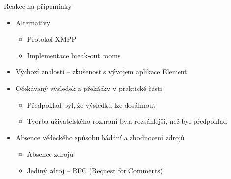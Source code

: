 \documentclass[aspectratio=169]{beamer}
\begin{document}
\begin{frame}{Reakce na připomínky}
    \pause
    \begin{itemize}[<+->]
        \item Alternativy
              \begin{itemize}
                  \item Protokol XMPP
                  \item Implementace break-out rooms
              \end{itemize}
        \item Výchozí znalosti -- zkušenost s vývojem aplikace Element
        \item Očekávaný výsledek a překážky v praktické části
              \begin{itemize}
                  \item Předpoklad byl, že výsledku lze dosáhnout
                  \item Tvorba uživatelského rozhraní byla rozsáhlejší, než byl předpoklad
              \end{itemize}
        \item Absence vědeckého způsobu bádání a zhodnocení zdrojů
              \begin{itemize}
                  \item Absence zdrojů
                  \item Jediný zdroj -- RFC (Request for Comments)
              \end{itemize}
    \end{itemize}
\end{frame}
\end{document}
